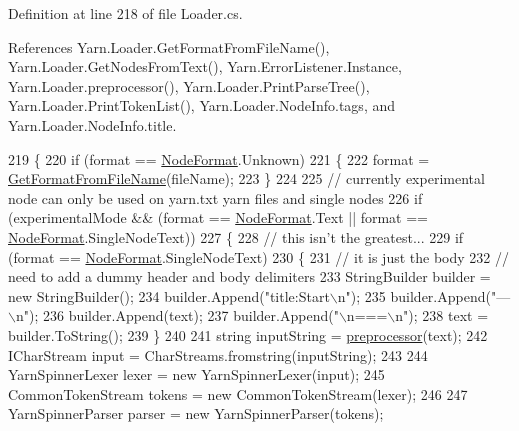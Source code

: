 Definition at line 218 of file Loader.\-cs.



References Yarn.\-Loader.\-Get\-Format\-From\-File\-Name(), Yarn.\-Loader.\-Get\-Nodes\-From\-Text(), Yarn.\-Error\-Listener.\-Instance, Yarn.\-Loader.\-preprocessor(), Yarn.\-Loader.\-Print\-Parse\-Tree(), Yarn.\-Loader.\-Print\-Token\-List(), Yarn.\-Loader.\-Node\-Info.\-tags, and Yarn.\-Loader.\-Node\-Info.\-title.


\begin{DoxyCode}
219         \{
220             \textcolor{keywordflow}{if} (format == \hyperlink{a00053_ad7ebb46e7309ead8767383a672b3272f}{NodeFormat}.Unknown)
221             \{
222                 format = \hyperlink{a00135_a080b2d6b7553c178007c04297d50e9da}{GetFormatFromFileName}(fileName);
223             \}
224 
225             \textcolor{comment}{// currently experimental node can only be used on yarn.txt yarn files and single nodes}
226             \textcolor{keywordflow}{if} (experimentalMode && (format == \hyperlink{a00053_ad7ebb46e7309ead8767383a672b3272f}{NodeFormat}.Text || format == 
      \hyperlink{a00053_ad7ebb46e7309ead8767383a672b3272f}{NodeFormat}.SingleNodeText))
227             \{
228                 \textcolor{comment}{// this isn't the greatest...}
229                 \textcolor{keywordflow}{if} (format == \hyperlink{a00053_ad7ebb46e7309ead8767383a672b3272f}{NodeFormat}.SingleNodeText)
230                 \{
231                     \textcolor{comment}{// it is just the body}
232                     \textcolor{comment}{// need to add a dummy header and body delimiters}
233                     StringBuilder builder = \textcolor{keyword}{new} StringBuilder();
234                     builder.Append(\textcolor{stringliteral}{"title:Start\(\backslash\)n"});
235                     builder.Append(\textcolor{stringliteral}{"---\(\backslash\)n"});
236                     builder.Append(text);
237                     builder.Append(\textcolor{stringliteral}{"\(\backslash\)n===\(\backslash\)n"});
238                     text = builder.ToString();
239                 \}
240 
241                 \textcolor{keywordtype}{string} inputString = \hyperlink{a00135_a0b09a29edd2ed13d52203f1b71a47081}{preprocessor}(text);
242                 ICharStream input = CharStreams.fromstring(inputString);
243 
244                 YarnSpinnerLexer lexer = \textcolor{keyword}{new} YarnSpinnerLexer(input);
245                 CommonTokenStream tokens = \textcolor{keyword}{new} CommonTokenStream(lexer);
246 
247                 YarnSpinnerParser parser = \textcolor{keyword}{new} YarnSpinnerParser(tokens);

\end{DoxyCode}
